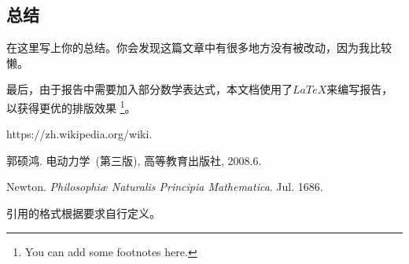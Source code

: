 \documentclass[a4paper,11pt,onecolumn,twoside]{article}
\begin{document}
\begin{multicols}{2}
\section{总结}

在这里写上你的总结。你会发现这篇文章中有很多地方没有被改动，因为我比较懒。

最后，由于报告中需要加入部分数学表达式，本文档使用了$LaTeX$来编写报告，以获得更优的排版效果
\footnote{You can add some footnotes here.}。


\small
\begin{thebibliography}{99}
\setlength{\parskip}{0pt}  %

https://zh.wikipedia.org/wiki.

郭硕鸿. 电动力学~(第三版), 高等教育出版社, 2008.6.

Newton. \emph{Philosophiæ Naturalis Principia Mathematica}. Jul. 1686.

引用的格式根据要求自行定义。


\end{thebibliography}


\iffalse
\normalsize
\parpic{%
\includegraphics[width=3.0cm]%
{Hou.jpg}}
\indent Yuzhe, ...
\fi


\end{multicols}


\clearpage
\end{document}
